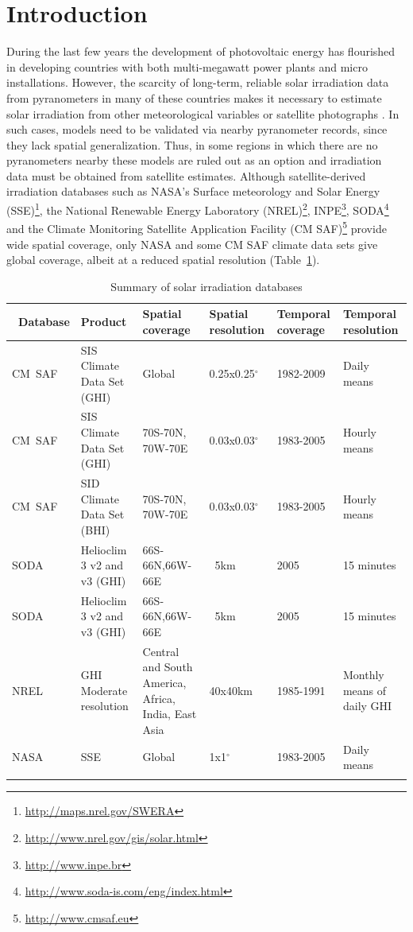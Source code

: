 \documentclass[11pt, english]{article}
\let\cite\citep
\begin{document}
\section{Introduction}

During the last few years the development of photovoltaic energy has
flourished in developing countries with both multi-megawatt power
plants and micro installations. However, the scarcity of long-term,
reliable solar irradiation data from pyranometers in many of these
countries makes it necessary to estimate solar irradiation from other
meteorological variables or satellite photographs
\cite{Schulz.Albert.ea2009}. In such cases, models need to be
validated via nearby pyranometer records, since they lack spatial
generalization. Thus, in some regions in which there are no
pyranometers nearby these models are ruled out as an option and
irradiation data must be obtained from satellite estimates. Although
satellite-derived irradiation databases such as NASA’s Surface
meteorology and Solar Energy
(SSE)\footnote{\url{http://maps.nrel.gov/SWERA}}, the National
Renewable Energy Laboratory
(NREL)\footnote{\url{http://www.nrel.gov/gis/solar.html}},
INPE\footnote{\url{http://www.inpe.br}},
SODA\footnote{\url{http://www.soda-is.com/eng/index.html}} and the
Climate Monitoring Satellite Application Facility (CM
SAF)\footnote{\url{http://www.cmsaf.eu}} provide wide spatial
coverage, only NASA and some CM SAF climate data sets give global
coverage, albeit at a reduced spatial resolution
(Table~\ref{tab:databases}).  

\begin{small}
\begin{longtable}{p{}p{}p{}p{}p{}p{}}
\toprule
\ Database&Product&Spatial coverage&Spatial resolution&Temporal coverage&Temporal resolution \\
\midrule
\endhead
CM~SAF&SIS Climate Data Set (GHI)&Global&0.25x0.25$^\circ$&1982-2009&Daily means\\
\midrule
CM~SAF&SIS Climate Data Set (GHI)&70S-70N, 70W-70E&0.03x0.03$^\circ$&1983-2005&Hourly means\\
\midrule
CM~SAF&SID Climate Data Set (BHI)&70S-70N, 70W-70E&0.03x0.03$^\circ$&1983-2005&Hourly means\\
\midrule
SODA& Helioclim 3 v2 and v3 (GHI)&66S-66N,66W-66E&~5km&2005&15 minutes\\
\midrule
SODA& Helioclim 3 v2 and v3 (GHI)&66S-66N,66W-66E&~5km&2005&15 minutes\\
\midrule
NREL& GHI Moderate resolution&Central and South America, Africa, India, East Asia&40x40km&1985-1991&Monthly means of daily GHI\\
\midrule
NASA& SSE&Global&1x1$^\circ$&1983-2005&Daily means\\
\bottomrule
\caption{Summary of solar irradiation databases}
\label{tab:databases}
\end{longtable}
\end{small}
\end{document}
